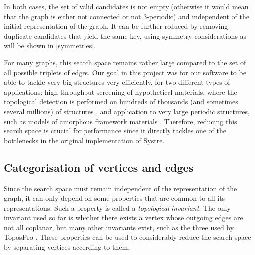\documentclass[main.tex]{subfiles}
\begin{document}
In both cases, the set of valid candidates is not empty (otherwise it would mean that the graph is either not connected or not 3-periodic) and independent of the initial representation of the graph. It can be further reduced by removing duplicate candidates that yield the same key, using symmetry considerations as will be shown in \autoref{symmetries}.


For many graphs, this search space remains rather large compared to the set of all possible triplets of edges.  %
Our goal in this project was for our software to be able to tackle very big structures very efficiently, for two different types of applications: high-throughput screening of hypothetical materials, where the topological detection is performed on hundreds of thousands (and sometimes several millions) of structures \autocite{ren2022highthroughput}, and application to very large periodic structures, such as models of amorphous framework materials \autocite{castel2022atomistic}. Therefore, reducing this search space is crucial for performance since it directly tackles one of the bottlenecks in the original implementation of Systre.

\subsection{Categorisation of vertices and edges}

Since the search space must remain independent of the representation of the graph, it can only depend on some properties that are common to all its representations. Such a property is called a \emph{topological invariant}. The only invariant used so far is whether there exists a vertex whose outgoing edges are not all coplanar, but many other invariants exist, such as the three used by ToposPro \autocite{ToposPro}. These properties can be used to considerably reduce the search space by separating vertices according to them.
\end{document}
